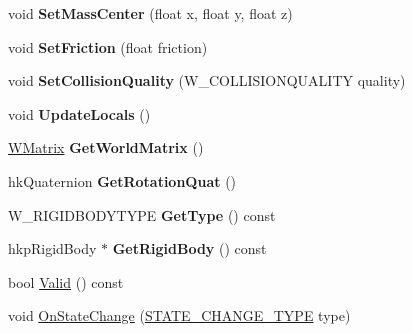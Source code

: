 \begin{DoxyCompactItemize}
\item 
void {\bfseries Set\+Mass\+Center} (float x, float y, float z)\hypertarget{class_w_rigid_body_a0ba6bdef1009af5e2b9a727c2f2c61bd}{}\label{class_w_rigid_body_a0ba6bdef1009af5e2b9a727c2f2c61bd}

\item 
void {\bfseries Set\+Friction} (float friction)\hypertarget{class_w_rigid_body_a838f02a36008f35a147559cbc13f70df}{}\label{class_w_rigid_body_a838f02a36008f35a147559cbc13f70df}

\item 
void {\bfseries Set\+Collision\+Quality} (W\+\_\+\+C\+O\+L\+L\+I\+S\+I\+O\+N\+Q\+U\+A\+L\+I\+TY quality)\hypertarget{class_w_rigid_body_a59ae32965717783503f6e48f8f517ac9}{}\label{class_w_rigid_body_a59ae32965717783503f6e48f8f517ac9}

\item 
void {\bfseries Update\+Locals} ()\hypertarget{class_w_rigid_body_a9b141522ff4411f1ac37d305d9c0be03}{}\label{class_w_rigid_body_a9b141522ff4411f1ac37d305d9c0be03}

\item 
\hyperlink{class_w_matrix}{W\+Matrix} {\bfseries Get\+World\+Matrix} ()\hypertarget{class_w_rigid_body_ab3cc8c79271698d419366ae46eb6eb29}{}\label{class_w_rigid_body_ab3cc8c79271698d419366ae46eb6eb29}

\item 
hk\+Quaternion {\bfseries Get\+Rotation\+Quat} ()\hypertarget{class_w_rigid_body_aed8c098ac5ccf28bb54ebf7b36ac7ebd}{}\label{class_w_rigid_body_aed8c098ac5ccf28bb54ebf7b36ac7ebd}

\item 
W\+\_\+\+R\+I\+G\+I\+D\+B\+O\+D\+Y\+T\+Y\+PE {\bfseries Get\+Type} () const \hypertarget{class_w_rigid_body_af0049bed9390a0dc83531b3d1787746b}{}\label{class_w_rigid_body_af0049bed9390a0dc83531b3d1787746b}

\item 
hkp\+Rigid\+Body $\ast$ {\bfseries Get\+Rigid\+Body} () const \hypertarget{class_w_rigid_body_af946a0a31d324c53dcd6aa987dbf1ff1}{}\label{class_w_rigid_body_af946a0a31d324c53dcd6aa987dbf1ff1}

\item 
bool \hyperlink{class_w_rigid_body_a895e5c8c2f9664e87cfed33fd29af8fa}{Valid} () const 
\item 
void \hyperlink{class_w_rigid_body_aaf4060f7a9dd7bf4f413f5c7af26381a}{On\+State\+Change} (\hyperlink{_w_orientation_8h_afe94de0a48bbd7b343ab18bc318cef28}{S\+T\+A\+T\+E\+\_\+\+C\+H\+A\+N\+G\+E\+\_\+\+T\+Y\+PE} type)
\end{DoxyCompactItemize}
